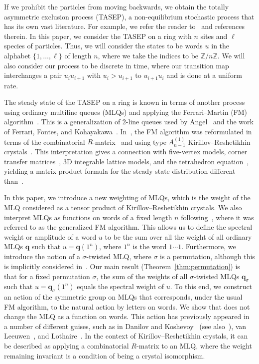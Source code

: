 \documentclass[reqno]{amsart}
\newcommand{\0}{\phantom{c}}
\newcommand{\qq}{\mathbf{q}}
\newcommand{\ZZ}{\mathbb{Z}}
\theoremstyle{plain}
\theoremstyle{definition}
\numberwithin{equation}{section}
\begin{document}
If we prohibit the particles from moving backwards, we obtain the totally asymmetric exclusion process (TASEP), a non-equilibrium stochastic process that has its own vast literature.
For example, we refer the reader to~\cite{AasLin17,AAMP,BE07,BP14,DEHP93,KMO15,KMO16,Liggett99} and references therein.
In this paper, we consider the TASEP on a ring with $n$ sites and $\ell$ species of particles.
Thus, we will consider the states to be words $u$ in the alphabet $\{1, \dotsc, \ell\}$ of length $n$, where we take the indices to be $\ZZ / n \ZZ$.
We will also consider our process to be discrete in time, where our transition map interchanges a pair $u_i u_{i+1}$ with $u_i > u_{i+1}$ to $u_{i+1} u_i$ and is done at a uniform rate.

The steady state of the TASEP on a ring is known in terms of another process using ordinary multiline queues (MLQs) and applying the Ferrari--Martin (FM) algorithm~\cite{FM06,FM07}.
This is a generalization of 2-line queues used by Angel~\cite{Angel06} and the work of Ferrari, Fontes, and Kohayakawa~\cite{FFK94}.
In~\cite{KMO15,KMO16}, the FM algorithm was reformulated in terms of the combinatorial $R$-matrix~\cite{NY97,Shimozono02} and using type $A_{n-1}^{(1)}$ Kirillov--Reshetikhin crystals~\cite{KKMMNN92}.
This interpretation gives a connection with five-vertex models, corner transfer matrices~\cite{Baxter89}, 3D integrable lattice models, and the tetrahedron equation~\cite{Zam80}, yielding a matrix product formula for the steady state distribution different than~\cite{CdGW15,EFM09,PEM09}.

In this paper, we introduce a new weighting of MLQs, which is the weight of the MLQ considered as a tensor product of Kirillov--Reshetikhin crystals.
We also interpret MLQs as functions on words of a fixed length $n$ following~\cite{AAMP}, where it was referred to as the generalized FM algorithm.
This allows us to define the spectral weight or amplitude of a word $u$ to be the sum over all the weight of all ordinary MLQs $\qq$ such that $u = \qq(1^n)$, where $1^n$ is the word $1 \dotsm 1$.
Furthermore, we introduce the notion of a $\sigma$-twisted MLQ, where $\sigma$ is a permutation, although this is implicitly considered in~\cite{AAMP}.
Our main result (Theorem~\ref{thm:permutation}) is that for a fixed permutation $\sigma$, the sum of the weights of all $\sigma$-twisted MLQs $\qq_{\sigma}$ such that $u = \qq_{\sigma}(1^n)$ equals the spectral weight of $u$.
To this end, we construct an action of the symmetric group on MLQs that corresponds, under the usual FM algorithm, to the natural action by letters on words.
We show that does not change the MLQ as a function on words.
This action has previously appeared in a number of different guises, such as in Danilov and Koshevoy~\cite{DanilovKoshevoy} (see also~\cite[Ch.~4]{Gorodentsev2}), van Leeuwen~\cite[Lemma~2.3]{vanLeeuwen-dc}, and Lothaire~\cite[Ch.~5, (5.6.3)]{Loth}.
In the context of Kirillov--Reshetikhin crystals, it can be described as applying a combinatorial $R$-matrix to an MLQ, where the weight remaining invariant is a condition of being a crystal isomorphism.
\end{document}
